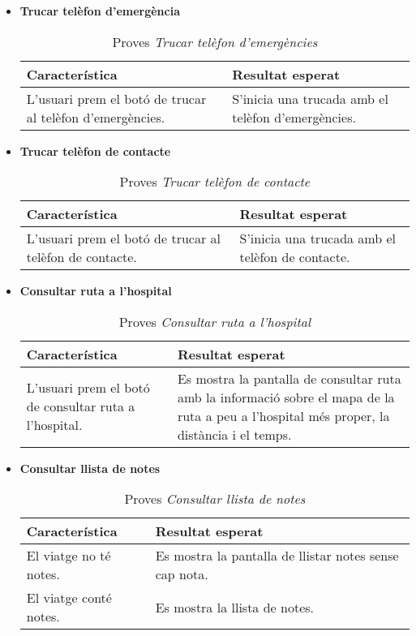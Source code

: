 \begin{itemize}
\clearpage

\item{}\textbf{Trucar telèfon d'emergència}

\begin{table}[!h]
\centering
\begin{tabular}{|T|T|}
\hline
\textbf{Característica} & \textbf{Resultat esperat} \\\hline
L'usuari prem el botó de trucar al telèfon d'emergències. & S'inicia una trucada amb el telèfon d'emergències.\\\hline
\end{tabular}
\label{}
\caption{Proves \textit{Trucar telèfon d'emergències}}
\end{table}

\item{}\textbf{Trucar telèfon de contacte}

\begin{table}[!h]
\centering
\begin{tabular}{|T|T|}
\hline
\textbf{Característica} & \textbf{Resultat esperat} \\\hline
L'usuari prem el botó de trucar al telèfon de contacte. & S'inicia una trucada amb el telèfon de contacte.\\\hline
\end{tabular}
\label{}
\caption{Proves \textit{Trucar telèfon de contacte}}
\end{table}

\item{}\textbf{Consultar ruta a l'hospital}

\begin{table}[!h]
\centering
\begin{tabular}{|T|T|}
\hline
\textbf{Característica} & \textbf{Resultat esperat} \\\hline
L'usuari prem el botó de consultar ruta a l'hospital. & Es mostra la pantalla de consultar ruta amb la informació sobre el mapa de la ruta a peu a l'hospital més proper, la distància i el temps.\\\hline
\end{tabular}
\label{}
\caption{Proves \textit{Consultar ruta a l'hospital}}
\end{table}

\item{}\textbf{Consultar llista de notes}

\begin{table}[!h]
\centering
\begin{tabular}{|T|T|}
\hline
\textbf{Característica} & \textbf{Resultat esperat} \\\hline
El viatge no té notes. & Es mostra la pantalla de llistar notes sense cap nota.\\\hline
El viatge conté notes. & Es mostra la llista de notes.\\\hline
\end{tabular}
\label{}
\caption{Proves \textit{Consultar llista de notes}}
\end{table}


\end{itemize}
